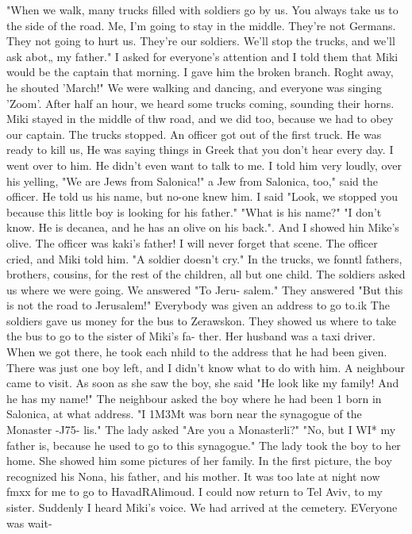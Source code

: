 "When we walk, many trucks filled with soldiers go by us. You always take us to 
the side of the road. Me, I'm going to stay in the middle. They're not Germans. They 
not going to hurt us. They're our soldiers. We'll stop the trucks, and we'll ask abot„ 
my father." 
I asked for everyone's attention and I told them that Miki would be the captain 
that morning. I gave him the broken branch. Roght away, he shouted 'March!" 
We were walking and dancing, and everyone was singing 'Zoom'. After half an hour, 
we heard some trucks coming, sounding their horns. Miki stayed in the middle of thw 
road, and we did too, because we had to obey our captain. The trucks stopped. An 
officer got out of the first truck. He was ready to kill us, He was saying things in 
Greek that you don't hear every day. I went over to him. He didn't even want to talk 
to me. I told him very loudly, over his yelling, "We are Jews from Salonica!" 
a Jew from Salonica, too," said the officer. He told us his name, but no-one knew him. 
I said "Look, we stopped you because this little boy is looking for his father." 
"What is his name?" 
"I don't know. He is decanea, and he has an olive on his back.". And I showed hin 
Mike's olive. The officer was kaki's father! I will never forget that scene. The 
officer cried, and Miki told him. "A soldier doesn't cry." 
In the trucks, we fonntl fathers, brothers, cousins, for the rest of the children, 
all but one child. The soldiers asked us where we were going. We answered "To Jeru-
salem." They answered "But this is not the road to Jerusalem!" 
Everybody was given an address to go to.ik The soldiers gave us money for the bus 
to Zerawskon. They showed us where to take the bus to go to the sister of Miki's fa-
ther. Her husband was a taxi driver. When we got there, he took each nhild to the 
address that he had been given. There was just one boy left, and I didn't know what to 
do with him. A neighbour came to visit. As soon as she saw the boy, she said "He look 
like my family! And he has my name!" The neighbour asked the boy where he had been 1 
born in Salonica, at what address. "I 1M3Mt was born near the synagogue of the Monaster 
-J75- 
lis." The lady asked "Are you a Monasterli?" "No, but I WI* my father is, because 
he used to go to this synagogue." 
The lady took the boy to her home. She showed him some pictures of her family. In 
the first picture, the boy recognized his Nona, his father, and his mother. It was too 
late at night now fmxx for me to go to HavadRAlimoud. I could now return to Tel Aviv, 
to my sister. 
Suddenly I heard Miki's voice. We had arrived at the cemetery. EVeryone was wait-
